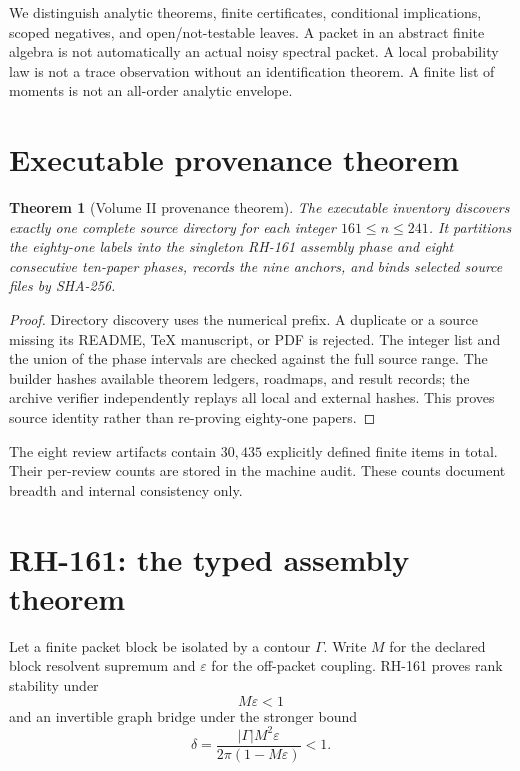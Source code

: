 \documentclass[11pt]{article}
\newtheorem{theorem}{Theorem}[section]
\theoremstyle{definition}
\theoremstyle{remark}
\begin{document}
We distinguish analytic theorems, finite certificates, conditional
implications, scoped negatives, and open/not-testable leaves.  A packet in an
abstract finite algebra is not automatically an actual noisy spectral packet.
A local probability law is not a trace observation without an identification
theorem.  A finite list of moments is not an all-order analytic envelope.

\section{Executable provenance theorem}

\begin{theorem}[Volume II provenance theorem]\label{thm:provenance}
The executable inventory discovers exactly one complete source directory for
each integer $161\le n\le241$.  It partitions the eighty-one labels into the
singleton RH-161 assembly phase and eight consecutive ten-paper phases,
records the nine anchors, and binds selected source files by SHA-256.
\end{theorem}
\begin{proof}
Directory discovery uses the numerical prefix.  A duplicate or a source
missing its README, TeX manuscript, or PDF is rejected.  The integer list and
the union of the phase intervals are checked against the full source range.
The builder hashes available theorem ledgers, roadmaps, and result records;
the archive verifier independently replays all local and external hashes.
This proves source identity rather than re-proving eighty-one papers.
\end{proof}

The eight review artifacts contain $30{,}435$ explicitly defined finite
items in total.  Their per-review counts are stored in the machine audit.
These counts document breadth and internal consistency only.

\section{RH-161: the typed assembly theorem}

Let a finite packet block be isolated by a contour $\Gamma$.  Write $M$ for
the declared block resolvent supremum and $\varepsilon$ for the off-packet
coupling.  RH-161 proves rank stability under
\[
 M\varepsilon<1
\]
and an invertible graph bridge under the stronger bound
\begin{equation}\label{eq:delta}
 \delta=\frac{|\Gamma|M^2\varepsilon}
 {2\pi(1-M\varepsilon)}<1.
\end{equation}
\end{document}
